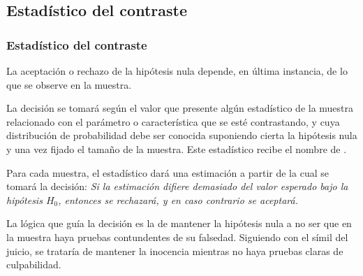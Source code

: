 \subsection{Estadístico del contraste}
\begin{frame}
\frametitle{Estadístico del contraste}
La aceptación o rechazo de la hipótesis nula depende, en última instancia, de lo que se observe en la muestra.

La decisión se tomará según el valor que presente algún estadístico de la muestra relacionado con el parámetro o característica que se esté contrastando, y cuya distribución de probabilidad debe ser conocida suponiendo cierta la hipótesis nula y una vez fijado el tamaño de la muestra.
Este estadístico recibe el nombre de .

Para cada muestra, el estadístico dará una estimación a partir de la cual se tomará la decisión: 
\alert{\emph{Si la estimación difiere demasiado del valor esperado bajo la hipótesis $H_0$, entonces se rechazará, y en caso contrario se aceptará.}}

La lógica que guía la decisión es la de mantener la hipótesis nula a no ser que en la muestra haya pruebas contundentes de su falsedad. Siguiendo con el símil del juicio, se trataría de mantener la inocencia mientras no haya pruebas claras de culpabilidad.
\end{frame}


